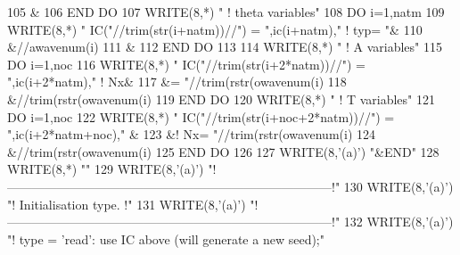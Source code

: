 \begin{DoxyCode}
105             &%
106 \textcolor{keywordflow}{    END DO}
107     \textcolor{keyword}{WRITE}(8,*) \textcolor{stringliteral}{" ! theta variables"}
108     \textcolor{keywordflow}{DO} i=1,natm
109        \textcolor{keyword}{WRITE}(8,*) \textcolor{stringliteral}{" IC("}//trim(str(i+natm))//\textcolor{stringliteral}{") = "},ic(i+natm),\textcolor{stringliteral}{"   ! typ= "}&
110             &//awavenum(i)%
111             &%
112 \textcolor{keywordflow}{    END DO}
113 
114     \textcolor{keyword}{WRITE}(8,*) \textcolor{stringliteral}{" ! A variables"}
115     \textcolor{keywordflow}{DO} i=1,noc
116        \textcolor{keyword}{WRITE}(8,*) \textcolor{stringliteral}{" IC("}//trim(str(i+2*natm))//\textcolor{stringliteral}{") = "},ic(i+2*natm),\textcolor{stringliteral}{"   ! Nx&}
117 \textcolor{stringliteral}{}\textcolor{stringliteral}{            &= "}//trim(rstr(owavenum(i)%
118             &//trim(rstr(owavenum(i)%
119 \textcolor{keywordflow}{    END DO}
120     \textcolor{keyword}{WRITE}(8,*) \textcolor{stringliteral}{" ! T variables"}
121     \textcolor{keywordflow}{DO} i=1,noc
122        \textcolor{keyword}{WRITE}(8,*) \textcolor{stringliteral}{" IC("}//trim(str(i+noc+2*natm))//\textcolor{stringliteral}{") = "},ic(i+2*natm+noc),\textcolor{stringliteral}{"   &}
123 \textcolor{stringliteral}{}\textcolor{stringliteral}{            &! Nx= "}//trim(rstr(owavenum(i)%
124             &//trim(rstr(owavenum(i)%
125 \textcolor{keywordflow}{    END DO}
126 
127     \textcolor{keyword}{WRITE}(8,\textcolor{stringliteral}{'(a)'}) \textcolor{stringliteral}{"&END"}
128     \textcolor{keyword}{WRITE}(8,*) \textcolor{stringliteral}{""}
129     \textcolor{keyword}{WRITE}(8,\textcolor{stringliteral}{'(a)'}) \textcolor{stringliteral}{"!------------------------------------------------------------------------------!"}
130     \textcolor{keyword}{WRITE}(8,\textcolor{stringliteral}{'(a)'}) \textcolor{stringliteral}{"! Initialisation type.                                                         !"}
131     \textcolor{keyword}{WRITE}(8,\textcolor{stringliteral}{'(a)'}) \textcolor{stringliteral}{"!------------------------------------------------------------------------------!"}
132     \textcolor{keyword}{WRITE}(8,\textcolor{stringliteral}{'(a)'}) \textcolor{stringliteral}{"! type = 'read': use IC above (will generate a new seed);"}

\end{DoxyCode}
